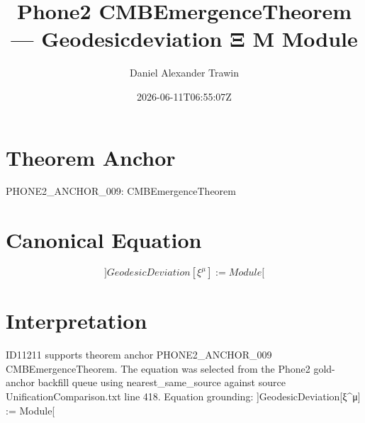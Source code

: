 \documentclass[11pt]{article}
\title{Phone2 CMBEmergenceTheorem — Geodesicdeviation Ξ Μ Module}
\author{Daniel Alexander Trawin}
\date{2026-06-11T06:55:07Z}
\begin{document}
\maketitle
\section*{Theorem Anchor}
PHONE2_ANCHOR_009: CMBEmergenceTheorem
\section*{Canonical Equation}
\[
]GeodesicDeviation[ξ^μ] := Module[
\]
\section*{Interpretation}
ID11211 supports theorem anchor PHONE2_ANCHOR_009 CMBEmergenceTheorem. The equation was selected from the Phone2 gold-anchor backfill queue using nearest_same_source against source UnificationComparison.txt line 418. Equation grounding: ]GeodesicDeviation[ξ^μ] := Module[
\end{document}
